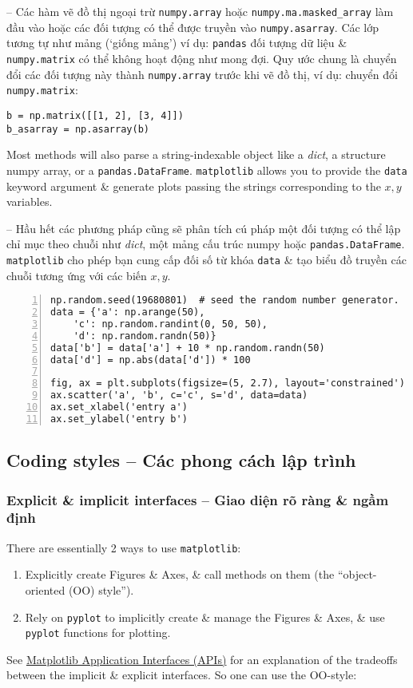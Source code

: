 \documentclass{article}
\begin{document}
-- Các hàm vẽ đồ thị ngoại trừ {\tt numpy.array} hoặc \verb|numpy.ma.masked_array| làm đầu vào hoặc các đối tượng có thể được truyền vào {\tt numpy.asarray}. Các lớp tương tự như mảng (`giống mảng') ví dụ: {\tt pandas} đối tượng dữ liệu \& {\tt numpy.matrix} có thể không hoạt động như mong đợi. Quy ước chung là chuyển đổi các đối tượng này thành {\tt numpy.array} trước khi vẽ đồ thị, ví dụ: chuyển đổi {\tt numpy.matrix}:
\begin{verbatim}
b = np.matrix([[1, 2], [3, 4]])
b_asarray = np.asarray(b)
\end{verbatim}
Most methods will also parse a string-indexable object like a {\it dict}, a structure numpy array, or a {\tt pandas.DataFrame}. {\tt matplotlib} allows you to provide the {\tt data} keyword argument \& generate plots passing the strings corresponding to the $x,y$ variables.

-- Hầu hết các phương pháp cũng sẽ phân tích cú pháp một đối tượng có thể lập chỉ mục theo chuỗi như {\it dict}, một mảng cấu trúc numpy hoặc {\tt pandas.DataFrame}. {\tt matplotlib} cho phép bạn cung cấp đối số từ khóa {\tt data} \& tạo biểu đồ truyền các chuỗi tương ứng với các biến $x,y$.
\begin{Verbatim}[numbers=left,xleftmargin=5mm]
np.random.seed(19680801)  # seed the random number generator.
data = {'a': np.arange(50),
    'c': np.random.randint(0, 50, 50),
    'd': np.random.randn(50)}
data['b'] = data['a'] + 10 * np.random.randn(50)
data['d'] = np.abs(data['d']) * 100

fig, ax = plt.subplots(figsize=(5, 2.7), layout='constrained')
ax.scatter('a', 'b', c='c', s='d', data=data)
ax.set_xlabel('entry a')
ax.set_ylabel('entry b')
\end{Verbatim}


\subsection{Coding styles -- Các phong cách lập trình}


\subsubsection{Explicit \& implicit interfaces -- Giao diện rõ ràng \& ngầm định}
There are essentially 2 ways to use {\tt matplotlib}:
\begin{enumerate}
    \item Explicitly create Figures \& Axes, \& call methods on them (the ``object-oriented (OO) style'').
    \item Rely on {\tt pyplot} to implicitly create \& manage the Figures \& Axes, \& use {\tt pyplot} functions for plotting.
\end{enumerate}
See \href{https://matplotlib.org/stable/users/explain/figure/api_interfaces.html#api-interfaces}{Matplotlib Application Interfaces (APIs)} for an explanation of the tradeoffs between the implicit \& explicit interfaces. So one can use the OO-style:
\end{document}
